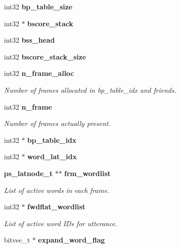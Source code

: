 \begin{DoxyCompactItemize}
\item 
int32 {\bfseries bp\-\_\-table\-\_\-size}\label{structngram__search__s_ae288500a2a3db50d4454546d66c826da}

\item 
int32 $\ast$ {\bfseries bscore\-\_\-stack}\label{structngram__search__s_adbbac268728dae5771cb4400649b62e2}

\item 
int32 {\bfseries bss\-\_\-head}\label{structngram__search__s_aed45eb7f0ed7bbf266a7eb8e4acd22fa}

\item 
int32 {\bfseries bscore\-\_\-stack\-\_\-size}\label{structngram__search__s_a041e34cc7c9dab32d05b00eeb5d6d622}

\item 
int32 {\bf n\-\_\-frame\-\_\-alloc}
\begin{DoxyCompactList}\small\item\em Number of frames allocated in bp\-\_\-table\-\_\-idx and friends. \end{DoxyCompactList}\item 
int32 {\bf n\-\_\-frame}
\begin{DoxyCompactList}\small\item\em Number of frames actually present. \end{DoxyCompactList}\item 
int32 $\ast$ {\bfseries bp\-\_\-table\-\_\-idx}\label{structngram__search__s_ad6c1eda51d21c066ead7d68541546485}

\item 
int32 $\ast$ {\bfseries word\-\_\-lat\-\_\-idx}\label{structngram__search__s_a175cf4fa7cffa91b1966343f5a6f6eaf}

\item 
{\bf ps\-\_\-latnode\-\_\-t} $\ast$$\ast$ {\bf frm\-\_\-wordlist}
\begin{DoxyCompactList}\small\item\em List of active words in each frame. \end{DoxyCompactList}\item 
int32 $\ast$ {\bf fwdflat\-\_\-wordlist}
\begin{DoxyCompactList}\small\item\em List of active word I\-Ds for utterance. \end{DoxyCompactList}\item 
bitvec\-\_\-t $\ast$ {\bfseries expand\-\_\-word\-\_\-flag}\label{structngram__search__s_a1daa869d11179c53eb745da36a654fb3}


\end{DoxyCompactItemize}
